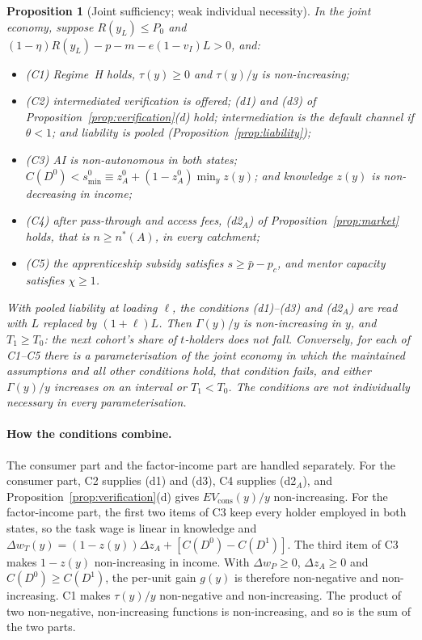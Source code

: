 \documentclass[12pt]{article}
\newtheorem{proposition}{Proposition}
\theoremstyle{remark}
\begin{document}
\begin{proposition}[Joint sufficiency; weak individual necessity]\label{prop:synthesis}
In the joint economy, suppose $R(y_L)\le P_0$ and $(1-\eta)R(y_L)-p-m-e(1-v_I)L>0$, and:
\begin{itemize}[itemsep=0pt]
\item[] (C1) Regime~H holds, $\tau(y)\ge0$ and $\tau(y)/y$ is non-increasing;
\item[] (C2) intermediated verification is offered; (d1) and (d3) of Proposition~\ref{prop:verification}(d) hold; intermediation is the default channel if $\theta<1$; and liability is pooled (Proposition~\ref{prop:liability});
\item[] (C3) AI is non-autonomous in both states; $C(D^0)<s^0_{\min}\equiv z_A^0+(1-z_A^0)\min_y z(y)$; and knowledge $z(y)$ is non-decreasing in income;
\item[] (C4) after pass-through and access fees, (d2$_A$) of Proposition~\ref{prop:market} holds, that is $n\ge n^*(A)$, in every catchment;
\item[] (C5) the apprenticeship subsidy satisfies $s\ge\bar p-p_c$, and mentor capacity satisfies $\chi\ge1$.
\end{itemize}
With pooled liability at loading $\ell$, the conditions (d1)--(d3) and (d2$_A$) are read with $L$ replaced by $(1+\ell)L$.
Then $\Gamma(y)/y$ is non-increasing in $y$, and $T_1\ge T_0$: the next cohort's share of $t$-holders does not fall. Conversely, for each of C1--C5 there is a parameterisation of the joint economy in which the maintained assumptions and all other conditions hold, that condition fails, and either $\Gamma(y)/y$ increases on an interval or $T_1<T_0$. The conditions are not individually necessary in every parameterisation.
\end{proposition}

\paragraph{How the conditions combine.} The consumer part and the factor-income part are handled separately. For the consumer part, C2 supplies (d1) and (d3), C4 supplies (d2$_A$), and Proposition~\ref{prop:verification}(d) gives $EV_{\text{cons}}(y)/y$ non-increasing. For the factor-income part, the first two items of C3 keep every holder employed in both states, so the task wage is linear in knowledge and $\Delta w_T(y)=(1-z(y))\Delta z_A+[C(D^0)-C(D^1)]$. The third item of C3 makes $1-z(y)$ non-increasing in income. With $\Delta w_P\ge0$, $\Delta z_A\ge0$ and $C(D^0)\ge C(D^1)$, the per-unit gain $g(y)$ is therefore non-negative and non-increasing. C1 makes $\tau(y)/y$ non-negative and non-increasing. The product of two non-negative, non-increasing functions is non-increasing, and so is the sum of the two parts.
\end{document}
